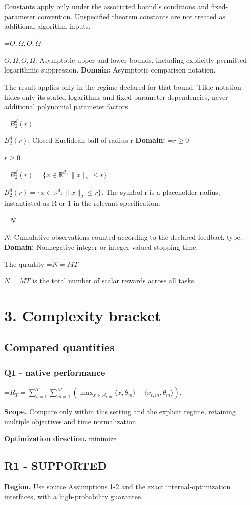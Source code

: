\documentclass[10pt,a4paper]{article}
\newcommand{\AtlasMath}[1]{\par\begingroup\centering\setbox0=\hbox{$\displaystyle #1$}\ifdim\wd0>1.4\linewidth\typeout{ATLAS WIDE FORMULA: \the\wd0}\fi\ifdim\wd0>\linewidth\resizebox{\linewidth}{!}{\box0}\else\box0\fi\par\endgroup}
\newcommand{\AtlasInlineMath}[1]{\begingroup\setbox0=\hbox{$#1$}\ifdim\wd0>.4\linewidth\endgroup\AtlasMath{#1}\else\endgroup$#1$\fi}
\begin{document}
Constants apply only under the associated bound’s conditions and fixed-parameter convention. Unspecified theorem constants are not treated as additional algorithm inputs.

\AtlasInlineMath{O,\Omega,\widetilde O,\widetilde\Omega}: Asymptotic upper and lower bounds, including explicitly permitted logarithmic suppression. \textbf{Domain:} Asymptotic comparison notation.

The result applies only in the regime declared for that bound. Tilde notation hides only its stated logarithms and fixed-parameter dependencies, never additional polynomial parameter factors.

\AtlasInlineMath{B_2^d(r)}: Closed Euclidean ball of radius r \textbf{Domain:} \AtlasInlineMath{r\ge0}.

\AtlasInlineMath{B_2^d(r)=\{x\in\mathbb R^d:\|x\|_2\le r\}}. The symbol r is a placeholder radius, instantiated as R or 1 in the relevant specification.

\AtlasInlineMath{N}: Cumulative observations counted according to the declared feedback type. \textbf{Domain:} Nonnegative integer or integer-valued stopping time.

The quantity \AtlasInlineMath{N=MT} is the total number of scalar rewards across all tasks.

\section{3. Complexity bracket}
\subsection{Compared quantities}
\subsubsection{Q1 - native performance}
\AtlasMath{R_T=\sum_{t=1}^{T}\sum_{m=1}^{M}\left(\max_{x\in\mathcal A_{t,m}}\langle x,\theta_m\rangle-\langle x_{t,m},\theta_m\rangle\right).}
\textbf{Scope.} Compare only within this setting and the explicit regime, retaining multiple objectives and time normalization.

\textbf{Optimization direction.} minimize

\subsection{R1 - SUPPORTED}
\textbf{Region.} Use source Assumptions 1-2 and the exact internal-optimization interfaces, with a high-probability guarantee.
\end{document}
